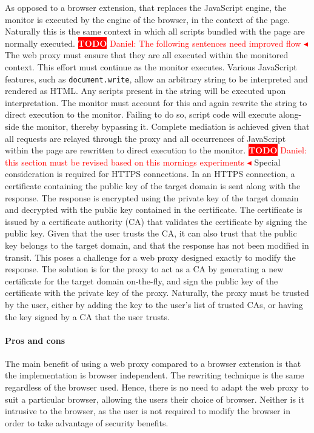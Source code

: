 \documentclass{llncs}
\newcommand{\todo}[1]{\colorbox{red}{\textcolor{white}{\sffamily\bfseries\scriptsize TODO}} \textcolor{red}{#1} \textcolor{red}{$\blacktriangleleft$}}
\begin{document}
As opposed to a browser extension, that replaces the 
JavaScript engine, the monitor is executed by the engine of the browser, in the context of the page. Naturally 
this is the same context in which all scripts bundled with the 
page are normally executed. 
\todo{Daniel: The following sentences need improved flow}
The web proxy must ensure that they are all executed within the 
monitored context. This effort must continue as the monitor executes. 
Various JavaScript features, such as 
\lstinline{document.write}, allow an arbitrary string to be 
interpreted and rendered as HTML. Any scripts present in the string will be 
executed upon interpretation. The monitor must account for this and again rewrite 
the string to direct execution to the monitor. Failing to do so, script code will execute 
along-side the monitor, thereby bypassing it. 
Complete mediation is achieved given that all requests are relayed through the proxy 
and all occurrences of JavaScript within the page are rewritten to direct execution to the monitor.
\todo{Daniel: this section must be revised based on this mornings experiments}
Special consideration is required for HTTPS connections. In an HTTPS 
connection, a certificate containing the public key of the target domain is sent 
along with the response. The response is encrypted using the private key of the target 
domain and decrypted with the public key contained in the certificate. The 
certificate is issued by a certificate authority (CA)
that validates the certificate by signing the public key. Given that the user 
trusts the CA, it can also trust that the public key belongs 
to the target domain, and that the response has not been modified in transit.
This poses a challenge for a web proxy designed exactly to modify the response. The solution 
is for the proxy to act as a CA by generating a
new certificate for the target domain on-the-fly, and sign the 
public key of the certificate with the private key of the proxy. Naturally, 
the proxy must be trusted by the user, either by adding the key to 
the user's list of trusted CAs, or having the key signed by a CA that the user trusts.



\paragraph{Pros and cons}
The main benefit of using a web proxy 
compared to a browser extension is that the implementation is browser independent. The 
rewriting technique is the same regardless of the browser used. Hence, there is no 
need to adapt the web proxy to suit a particular browser, allowing 
the users their choice of browser.
Neither is it intrusive to the browser, as the user is not required to modify the 
browser in order to take advantage of security benefits. 
\end{document}
